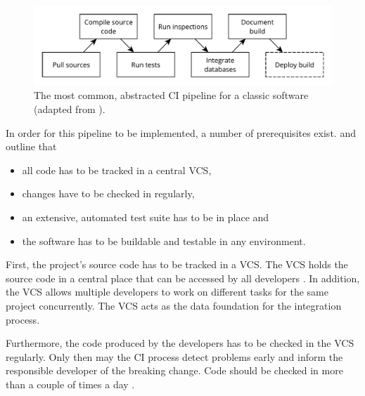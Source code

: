 \begin{figure}[H]
\begin{center}
  \includegraphics[scale=0.7]{images/figures/ci_classic.pdf}
\end{center}
\caption[The most common, abstracted \ac{CI} pipeline for a classic
software.]{The most common, abstracted \ac{CI} pipeline for a classic
software (adapted from \autocite[Fig. 1-4]{MatyasContinuousIntegration2007}).}%
\label{fig:ci_pipeline_classic}
\end{figure}

In order for this pipeline to be implemented, a number of prerequisites exist.
\autocite{MatyasContinuousIntegration2007} and
\autocite{JezHumbleContinuousDelivery2010} outline that

\begin{itemize}
  \item all code has to be tracked in a central \ac{VCS},
  \item changes have to be checked in regularly,
  \item an extensive, automated test suite has to be in place and
  \item the software has to be buildable and testable in any environment.
\end{itemize}

First, the project's source code has to be tracked in a \ac{VCS}. The \ac{VCS}
holds the source code in a central place that can be accessed by all developers
\autocite[Ch.  1]{MatyasContinuousIntegration2007}. In addition, the \ac{VCS}
allows multiple developers to work on different tasks for the same project
concurrently. The \ac{VCS} acts as the data foundation for the integration
process.

Furthermore, the code produced by the developers has to be checked in the
\ac{VCS} regularly. Only then may the \ac{CI} process detect problems early and
inform the responsible developer of the breaking change. Code should be checked
in more than a couple of times a day \autocite[p.
59]{JezHumbleContinuousDelivery2010}. 

